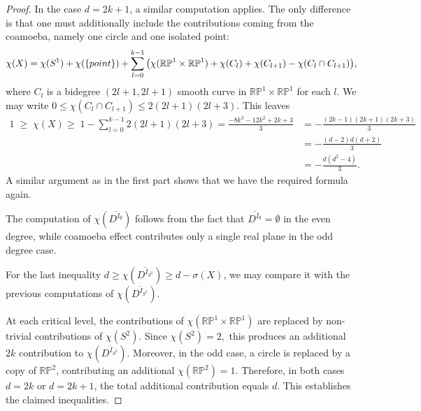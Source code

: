 \documentclass[10pt,a4paper]{amsart}
\newcommand{\RP}{\mathbb{R}\mathbb{P}}
\begin{document}
\begin{proof}
	In the case  $d=2k+1$, a similar computation applies. The only difference is that one must additionally include the contributions coming from the coamoeba, namely one circle and one isolated point:
	$$\chi(X)=\chi(S^1)+\chi({\text\{point\}})+\sum_{l=0}^{k-1}\big(\chi(\mathbb{RP}^1\times\mathbb{RP}^1)+\chi(C_l)+\chi(C_{l+1})-\chi(C_l\cap C_{l+1})\big),$$
	where $C_l$ is a bidegree $(2l+1,2l+1)$ smooth curve in $\mathbb{RP}^1\times\mathbb{RP}^1$ for each $l$. We may write $0\leq\chi(C_l\cap C_{l+1})\leq 2(2l+1)(2l+3)$. This leaves 
	\begin{align*}
		1 \;\geq\; \chi(X)\geq\;
		1-\sum_{l=0}^{k-1} 2(2l+1)(2l+3)=\frac{-8k^3-12k^2+2k+3}{3}&=-\frac{(2k-1)(2k+1)(2k+3)}{3} \\
		&=-\frac{(d-2)d(d+2)}{3} \\
		&=-\frac{d(d^2-4)}{3}.
	\end{align*}	A similar argument as in the first part shows that we have the required formula again.
	
	The computation of $\chi(\overline{D^{I_{\emptyset}}})$ follows from the fact that $\overline{D^{I_{\emptyset}}}=\emptyset$ in the even degree, while coamoeba effect contributes only a single real plane in the odd degree case.
	
	For the last inequality $d\geq\chi(\overline{D^{I_{S^2}}})\geq d-\sigma(X)$, we may compare it with the previous computations of $\chi(\overline{D^{I_{S^2}}})$.
	
	At each critical level, the contributions of $\chi(\RP^1\times\RP^1)$ are replaced by non-trivial contributions of $\chi(S^2)$. Since $\chi(S^2)=2,$ this produces an additional  $2k$ contribution to $\chi(\overline{D^{I_{S^2}}})$. Moreover, in the odd case, a circle is replaced by a copy of $\RP^2$, contributing an additional  $\chi(\RP^2)=1$. Therefore, in both cases  $d=2k$ or $d=2k+1$, the total additional contribution equals $d$. This establishes the claimed inequalities.
	
\end{proof}
\end{document}

